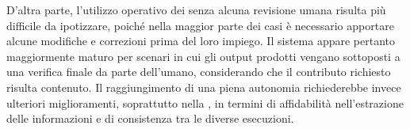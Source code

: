 D'altra parte, l'utilizzo operativo dei \capture{} senza alcuna revisione umana risulta più difficile da ipotizzare, poiché nella maggior parte dei casi è necessario apportare alcune modifiche e correzioni prima del loro impiego. Il sistema appare pertanto maggiormente maturo per scenari in cui gli output prodotti vengano sottoposti a una verifica finale da parte dell'umano, considerando che il contributo richiesto risulta contenuto. Il raggiungimento di una piena autonomia richiederebbe invece ulteriori miglioramenti, soprattutto nella \reversing{}, in termini di affidabilità nell'estrazione delle informazioni e di consistenza tra le diverse esecuzioni.

